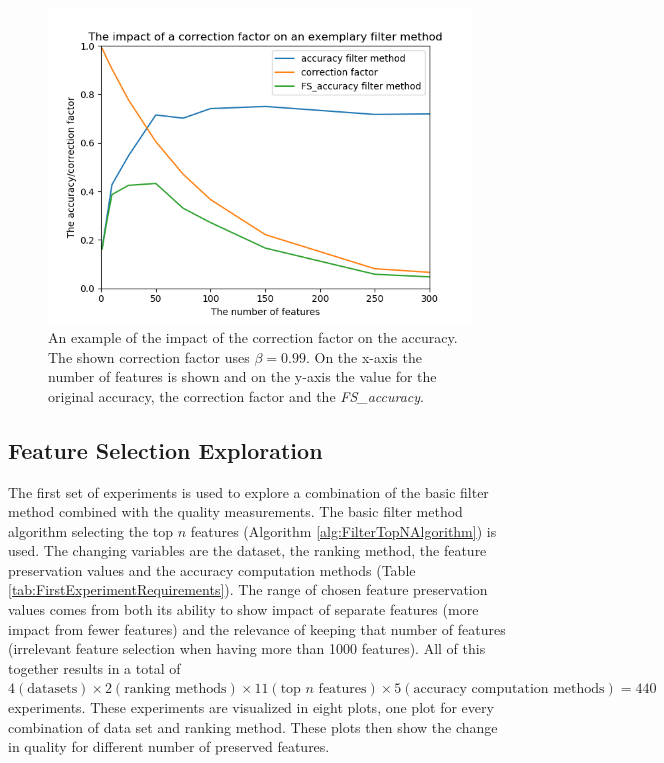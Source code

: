 \documentclass[10pt,a4paper]{report}
\begin{document}
	\begin{figure}[H]
		\includegraphics[]{FS_accuracy_example.png}
		\caption{An example of the impact of the correction factor on the accuracy. The shown correction factor uses $\beta = 0.99$. On the x-axis the number of features is shown and on the y-axis the value for the original accuracy, the correction factor and the \textit{FS\_accuracy}.}
		\label{fig:FSAccuracyExample}
	\end{figure}
	
	\subsection{Feature Selection Exploration}
	\label{FSsubsec:FeatureSelectionExploration}
	
	The first set of experiments is used to explore a combination of the basic filter method combined with the quality measurements. The basic filter method algorithm selecting the top $n$ features (Algorithm \ref{alg:FilterTopNAlgorithm}) is used. The changing variables are the dataset, the ranking method, the feature preservation values and the accuracy computation methods (Table \ref{tab:FirstExperimentRequirements}). The range of chosen feature preservation values comes from both its ability to show impact of separate features (more impact from fewer features) and the relevance of keeping that number of features (irrelevant feature selection when having more than 1000 features). All of this together results in a total of $4 (\text{datasets}) \times 2 (\text{ranking methods}) \times 11 (\text{top } n \text{ features}) \times 5 (\text{accuracy computation methods}) = 440$ experiments. These experiments are visualized in eight plots, one plot for every combination of data set and ranking method. These plots then show the change in quality for different number of preserved features.
	
\end{document}
